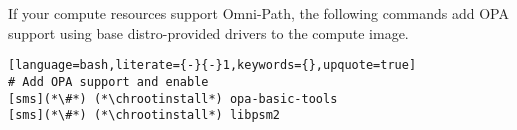 If your compute resources support Omni-Path, the following commands add OPA
support using base distro-provided drivers to the compute image. 

\begin{lstlisting}[language=bash,literate={-}{-}1,keywords={},upquote=true]
# Add OPA support and enable
[sms](*\#*) (*\chrootinstall*) opa-basic-tools
[sms](*\#*) (*\chrootinstall*) libpsm2
\end{lstlisting}
